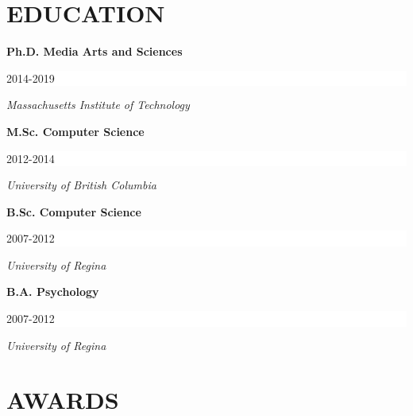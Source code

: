\documentclass[paper=letter,fontsize=11pt]{scrartcl} %
\newcommand{\NewPart}[2]{\section*{\uppercase{#1} #2}}
\newcommand{\EducationEntry}[3]{
		\noindent \textbf{#1} \hfill      %
		\colorbox{White}{%
			\parbox{10em}{%
			\hfill\color{Black}#2}} \par  %
		\noindent \textit{#3} \par}
\begin{document}



\NewPart{Education}{}

\EducationEntry{Ph.D. Media Arts and Sciences}{2014-2019} 
            {Massachusetts Institute of Technology}%
\smallskip

\EducationEntry{M.Sc. Computer Science}{2012-2014}{University of British Columbia}%
\smallskip

\EducationEntry{B.Sc. Computer Science}{2007-2012}{University of Regina} %
\smallskip

\EducationEntry{B.A. Psychology}{2007-2012}{University of Regina} %

\NewPart{Awards}{}
\end{document}
